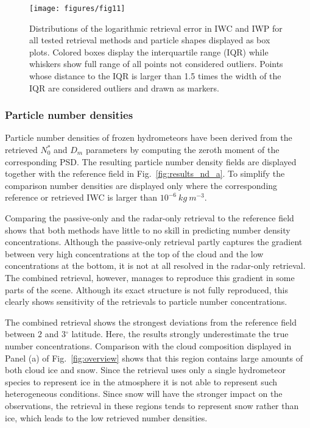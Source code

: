 \documentclass[journal abbreviation, manuscript]{copernicus}
\begin{document}
\begin{figure}[!h]
\centering
\texttt{[image: figures/fig11]}
\caption{Distributions of the logarithmic retrieval error in IWC and IWP for all tested retrieval
  methods and particle shapes displayed as box plots. Colored boxes display the interquartile range (IQR)
  while whiskers show full range of all points not considered outliers. Points whose distance to
  the IQR is larger than 1.5 times the width of the IQR are considered outliers and drawn as markers.}
\label{fig:boxes}
\end{figure}

\subsubsection{Particle number densities}

Particle number densities of frozen hydrometeors have been derived from the
retrieved $N_0^*$ and $D_m$ parameters by computing the zeroth moment of the
corresponding PSD. The resulting particle number density fields are displayed
together with the reference field in Fig.~\ref{fig:results_nd_a}. To simplify
the comparison number densities are displayed only where the corresponding
reference or retrieved IWC is larger than $10^{-6}\ \unit{kg\ m^{-3}}$.

Comparing the passive-only and the radar-only retrieval to the reference field
shows that both methods have little to no skill in predicting number density
concentrations. Although the passive-only retrieval partly captures the
gradient between very high concentrations at the top of the cloud and the low
concentrations at the bottom, it is not at all resolved in the radar-only
retrieval. The combined retrieval, however, manages to reproduce this gradient
in some parts of the scene. Although its exact structure is not fully
reproduced, this clearly shows sensitivity of the retrievals to particle number
concentrations.

The combined retrieval shows the strongest deviations from the reference field
between $2$ and $3\unit{^\circ}$ latitude. Here, the results strongly
underestimate the true number concentrations. Comparison with the cloud
composition displayed in Panel (a) of Fig.~\ref{fig:overview} shows that this
region contains large amounts of both cloud ice and snow. Since the retrieval
uses only a single hydrometeor species to represent ice in the atmosphere it is
not able to represent such heterogeneous conditions. Since snow will have the
stronger impact on the observations, the retrieval in these regions tends to
represent snow rather than ice, which leads to the low retrieved number densities.
\end{document}
